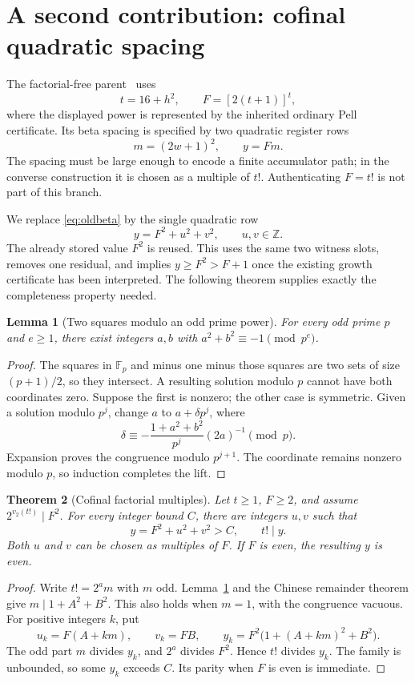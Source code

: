 \documentclass[10pt,letterpaper]{article}
\newtheorem{theorem}{Theorem}[section]
\newtheorem{lemma}[theorem]{Lemma}
\theoremstyle{definition}\newtheorem{remark}[theorem]{Remark}
\newcommand{\Z}{\mathbb Z}\newcommand{\Q}{\mathbb Q}\newcommand{\N}{\mathbb N}
\begin{document}
\section{A second contribution: cofinal quadratic spacing}\label{sec:cofinal}

The factorial-free parent~\cite{factorialfree} uses
\[
 t=16+h^2,\qquad F=[2(t+1)]^t,
\]
where the displayed power is represented by the inherited ordinary Pell
certificate. Its beta spacing is specified by two quadratic register rows
\begin{equation}\label{eq:oldbeta}
 m=(2w+1)^2,\qquad y=Fm.
\end{equation}
The spacing must be large enough to encode a finite accumulator path; in
the converse construction it is chosen as a multiple of $t!$. Authenticating
$F=t!$ is not part of this branch.

We replace \eqref{eq:oldbeta} by the single quadratic row
\begin{equation}\label{eq:newbeta}
 \boxed{\qquad y=F^2+u^2+v^2,\qquad u,v\in\Z.\qquad}
\end{equation}
The already stored value $F^2$ is reused. This uses the same two witness
slots, removes one residual, and implies $y\ge F^2>F+1$ once the existing
growth certificate has been interpreted. The following theorem supplies
exactly the completeness property needed.

\begin{lemma}[Two squares modulo an odd prime power]\label{lem:odd}
For every odd prime $p$ and $e\ge1$, there exist integers $a,b$ with
$a^2+b^2\equiv-1\pmod{p^e}$.
\end{lemma}
\begin{proof}
The squares in $\mathbb F_p$ and minus one minus those squares are two
sets of size $(p+1)/2$, so they intersect. A resulting solution modulo $p$
cannot have both coordinates zero. Suppose the first is nonzero; the other
case is symmetric. Given a solution modulo $p^j$, change $a$ to
$a+\delta p^j$, where
\[
 \delta\equiv
 -\frac{1+a^2+b^2}{p^j}(2a)^{-1}\pmod p.
\]
Expansion proves the congruence modulo $p^{j+1}$. The coordinate remains
nonzero modulo $p$, so induction completes the lift.
\end{proof}

\begin{theorem}[Cofinal factorial multiples]\label{thm:cofinal}
Let $t\ge1$, $F\ge2$, and assume $2^{v_2(t!)}\mid F^2$. For every
integer bound $C$, there are integers $u,v$ such that
\[
 y=F^2+u^2+v^2>C,\qquad t!\mid y.
\]
Both $u$ and $v$ can be chosen as multiples of $F$. If $F$ is even,
the resulting $y$ is even.
\end{theorem}
\begin{proof}
Write $t!=2^a m$ with $m$ odd. Lemma~\ref{lem:odd} and the Chinese
remainder theorem give $m\mid1+A^2+B^2$. This also holds when $m=1$,
with the congruence vacuous. For positive integers $k$, put
\[
 u_k=F(A+km),\qquad v_k=FB,\qquad
 y_k=F^2\bigl(1+(A+km)^2+B^2\bigr).
\]
The odd part $m$ divides $y_k$, and $2^a$ divides $F^2$. Hence $t!$ divides
$y_k$. The family is unbounded, so some $y_k$ exceeds $C$. Its parity
when $F$ is even is immediate.
\end{proof}
\end{document}
